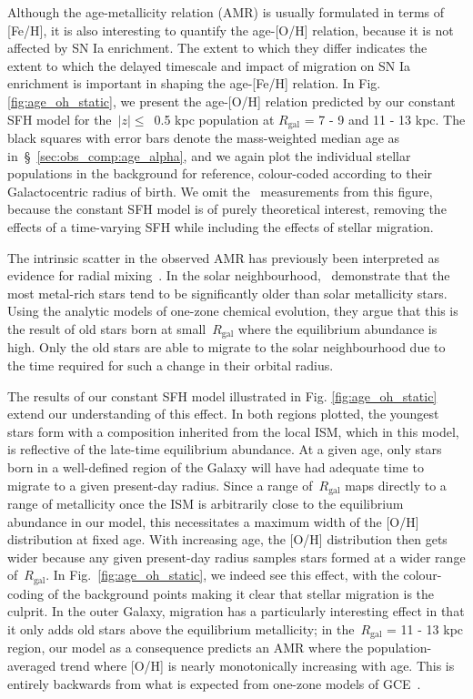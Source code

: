 \documentclass[fleqn, usenatbib]{mnras}
\begin{document}
Although the age-metallicity relation (AMR) is usually formulated in terms of 
[Fe/H], it is also interesting to quantify the age-[O/H] relation, because it 
is not affected by SN Ia enrichment. The extent to which they differ indicates 
the extent to which the delayed timescale and impact of migration on SN Ia 
enrichment is important in shaping the age-[Fe/H] relation. In Fig. 
\ref{fig:age_oh_static}, we present the age-[O/H] relation predicted by our 
constant SFH model for the~$\left|z\right|\leq$~0.5 kpc population at 
$R_\text{gal}$ = 7 - 9 and 11 - 13 kpc. The black squares with error bars 
denote the mass-weighted median age as in~\S~\ref{sec:obs_comp:age_alpha}, and 
we again plot the individual stellar populations in the background for 
reference, colour-coded according to their Galactocentric radius of birth. We 
omit the~\citet{Feuillet2019} measurements from this figure, because the 
constant SFH model is of purely theoretical interest, removing the effects of 
a time-varying SFH while including the effects of stellar migration. 
\par 
The intrinsic scatter in the observed AMR has previously been interpreted as 
evidence for radial mixing~\citep{Edvardsson1993, Sellwood2002}. In the 
solar neighbourhood,~\citet{Feuillet2018} demonstrate that the most metal-rich 
stars tend to be significantly older than solar metallicity stars. Using the 
\citet{Weinberg2017} analytic models of one-zone chemical evolution, they argue 
that this is the result of old stars born at small~$R_\text{gal}$ where the 
equilibrium abundance is high. Only the old stars are able to migrate to 
the solar neighbourhood due to the time required for such a change in their 
orbital radius. 
\par 
The results of our constant SFH model illustrated in Fig. 
\ref{fig:age_oh_static} extend our understanding of this effect. In both 
regions plotted, the youngest stars form with a composition inherited from the 
local ISM, which in this model, is reflective of the late-time equilibrium 
abundance. At a given age, only stars born in a well-defined region of the 
Galaxy will have had adequate time to migrate to a given present-day radius. 
Since a range of~$R_\text{gal}$ maps directly to a range of metallicity once 
the ISM is arbitrarily close to the equilibrium abundance in our model, this 
necessitates a maximum width of the [O/H] distribution at fixed age. With 
increasing age, the [O/H] distribution then gets wider because any given 
present-day radius samples stars formed at a wider range of~$R_\text{gal}$. 
In Fig.~\ref{fig:age_oh_static}, we indeed see this effect, with the 
colour-coding of the background points making it clear that stellar migration 
is the culprit. In the outer Galaxy, migration has a particularly interesting 
effect in that it only adds old stars above the equilibrium metallicity; in 
the~$R_\text{gal}$ = 11 - 13 kpc region, our model as a consequence predicts 
an AMR where the population-averaged trend where [O/H] is nearly monotonically 
increasing with age. This is entirely backwards from what is expected from 
one-zone models of GCE~\citep[e.g.][]{Andrews2017, Weinberg2017, Johnson2020}. 
\end{document}
